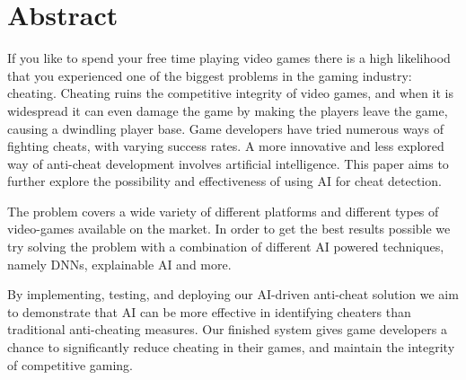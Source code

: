 \chapter{Abstract}
\label{ch:abstract}

If you like to spend your free time playing video games there is a high likelihood that you
experienced one of the biggest problems in the gaming industry: cheating. Cheating ruins the
competitive integrity of video games, and when it is widespread it can even damage the game by
making the players leave the game, causing a dwindling player base. Game developers have
tried numerous ways of fighting cheats, with varying success rates. A more innovative and less
explored way of anti-cheat development involves artificial intelligence. This paper aims to further explore the possibility
and effectiveness of using AI for cheat detection.

The problem covers a wide variety of different platforms and different types of video-games available on the market.
In order to get the best results possible we try solving the problem with a combination of different AI powered techniques, namely DNNs, explainable AI and more.

By implementing, testing, and deploying our AI-driven anti-cheat solution we aim to
demonstrate that AI can be more effective in identifying cheaters than traditional anti-cheating
measures. Our finished system gives game developers a chance to significantly reduce cheating
in their games, and maintain the integrity of competitive gaming.
